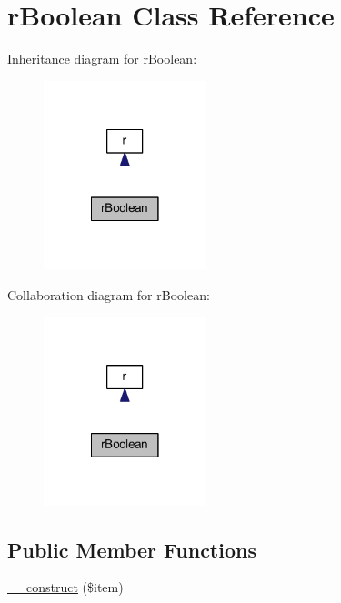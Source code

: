 \hypertarget{class_pierce_moore_1_1_ruby_p_h_p_1_1r_boolean}{\section{r\-Boolean Class Reference}
\label{class_pierce_moore_1_1_ruby_p_h_p_1_1r_boolean}
}


Inheritance diagram for r\-Boolean\-:
\nopagebreak
\begin{figure}[H]
\begin{center}
\leavevmode
\includegraphics[width=134pt]{class_pierce_moore_1_1_ruby_p_h_p_1_1r_boolean__inherit__graph}
\end{center}
\end{figure}


Collaboration diagram for r\-Boolean\-:
\nopagebreak
\begin{figure}[H]
\begin{center}
\leavevmode
\includegraphics[width=134pt]{class_pierce_moore_1_1_ruby_p_h_p_1_1r_boolean__coll__graph}
\end{center}
\end{figure}
\subsection*{Public Member Functions}
\begin{DoxyCompactItemize}
\item 
\hyperlink{class_pierce_moore_1_1_ruby_p_h_p_1_1r_boolean_a4b0c1fe0e6c94ec2df5006f414b164c4}{\-\_\-\-\_\-construct} (\$item)
\end{DoxyCompactItemize}
